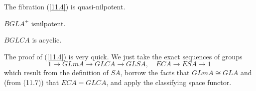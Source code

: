 \begin{prop}\label{11.5}
  The fibration (\ref{11.4}) is quasi-nilpotent.
 \end{prop} 

\begin{prop}\label{11.6}
  $BGLA^+$ isnilpotent.
 \end{prop} 

\begin{prop}
  $BGLCA$ is acyclic.
 \end{prop} 
The proof of (\ref{11.4}) is very quick. We just take the exact sequences of groups
\[1\longrightarrow GLmA \longrightarrow GLCA \longrightarrow GLSA, \quad ECA\longrightarrow ESA\longrightarrow 1\]
which result from the definition of $SA$, borrow the facts that $GLmA \cong GLA$ and (from (11.7))
that $ECA=GLCA$, and apply the classifying space functor.

